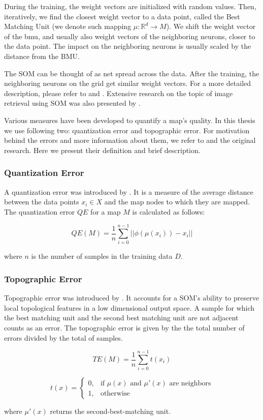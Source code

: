 During the training, the weight vectors are initialized with random values. Then, iteratively, we find the closest weight vector to a data point, called the Best Matching Unit (we denote such mapping $\mu: \mathbb{R}^d \rightarrow M$). We shift the weight vector of the \acrshort{bmu}, and usually also weight vectors of the neighboring neurons, closer to the data point. The impact on the neighboring neurons is usually scaled by the distance from the BMU.

The SOM can be thought of as net spread across the data. After the training, the neighboring neurons on the grid get similar weight vectors. For a more detailed description, please refer to \cite{kohonen1982self} and \cite{kohonen2007kohonen}. Extensive research on the topic of image retrieval using SOM was also presented by \cite{koskela2003interactive}.

Various measures have been developed to quantify a map's quality. In this thesis we use following two: quantization error and topographic error. For motivation behind the errors and more information about them, we refer to \cite{breard2017evaluating} and the original research. Here we present their definition and brief description.

\subsubsection*{Quantization Error}
A quantization error was introduced by \cite{kohonen1982self}. It is a measure of the average distance between the data points $x_i \in X$ and the map nodes to which they are mapped. The quantization error $QE$ for a map $M$ is calculated as follows:

$$
 QE(M) = \frac{1}{n}\sum_{i=0}^{n-1} ||\phi(\mu(x_i)) - x_i ||
$$

where $n$ is the number of samples in the training data $D$.

\subsubsection*{Topographic Error}

Topographic error was introduced by \cite{kiviluoto1996topology}. It accounts for a SOM's ability to preserve local topological features in a low dimensional output space. A sample for which the best matching unit and the second best matching unit are not adjacent counts as an error. The topographic error is given by the the total number of errors divided by the total of samples.

$$
    TE(M) = \frac{1}{n}\sum_{i=0}^{n-1}t(x_i)
$$

$$
    t(x) = \begin{cases}
			0, & \text{if $\mu(x)$ and $\mu'(x)$ are neighbors}\\
            1, & \text{otherwise}
		 \end{cases}
$$

where $\mu'(x)$ returns the second-best-matching unit.